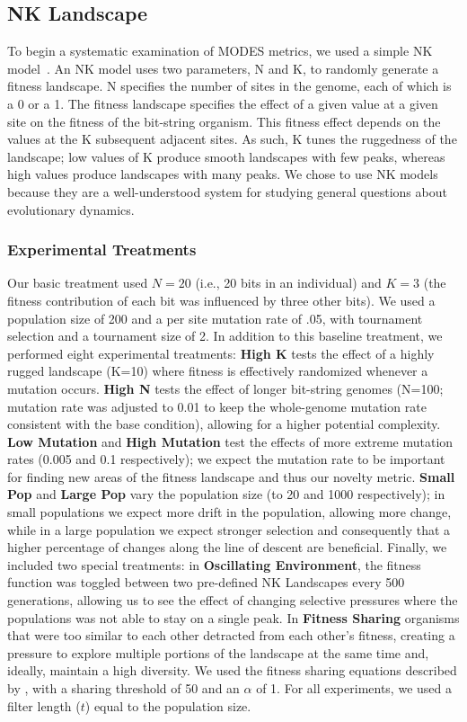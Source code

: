 \documentclass[letterpaper]{article}
\begin{document}
\subsection{NK Landscape}
To begin a systematic examination of MODES metrics, we used a simple NK model~\citep{kauffman_towards_1987}. An NK model uses two parameters, N and K, to randomly generate a fitness landscape. N specifies the number of sites in the genome, each of which is a 0 or a 1. The fitness landscape specifies the effect of a given value at a given site on the fitness of the bit-string organism. This fitness effect depends on the values at the K subsequent adjacent sites. As such, K tunes the ruggedness of the landscape; low values of K produce smooth landscapes with few peaks, whereas high values produce landscapes with many peaks. We chose to use NK models because they are a well-understood system for studying general questions about evolutionary dynamics.

\subsubsection{Experimental Treatments}
Our basic treatment used $N=20$ (i.e., 20 bits in an individual) and $K=3$ (the fitness contribution of each bit was influenced by three other bits).  We used a population size of 200 and a per site mutation rate of .05, with tournament selection and a tournament size of 2.
In addition to this baseline
treatment, we performed eight experimental treatments: \textbf{High K} tests the effect of a highly rugged landscape (K=10) where fitness is effectively randomized whenever a mutation occurs.  \textbf{High N} tests the effect of longer bit-string genomes (N=100; mutation rate was adjusted to 0.01 to keep the whole-genome mutation rate consistent with the base condition), allowing for a higher potential complexity.  \textbf{Low Mutation} and \textbf{High Mutation} test the effects of more extreme mutation rates (0.005 and 0.1 respectively); we expect the mutation rate to be important for finding new areas of the fitness landscape and thus our novelty metric.  \textbf{Small Pop} and \textbf{Large Pop} vary the population size (to 20 and 1000 respectively); in small populations we expect more drift in the population, allowing more change, while in a large population we expect stronger selection and consequently that a higher percentage of changes along the line of descent are beneficial.  Finally, we included two special treatments: in \textbf{Oscillating Environment}, the fitness function was toggled between two pre-defined NK Landscapes every 500 generations, allowing us to see the effect of changing selective pressures where the populations was not able to stay on a single peak.  In \textbf{Fitness Sharing} organisms that were too similar to each other detracted from each other's fitness, creating a pressure to explore multiple portions of the landscape at the same time and, ideally, maintain a high diversity. We used the fitness sharing equations described by \cite{goldberg_genetic_1987}, with a sharing threshold of 50 and an $\alpha$ of 1. For all experiments, we used a filter length ($t$) equal to the population size.
\end{document}
